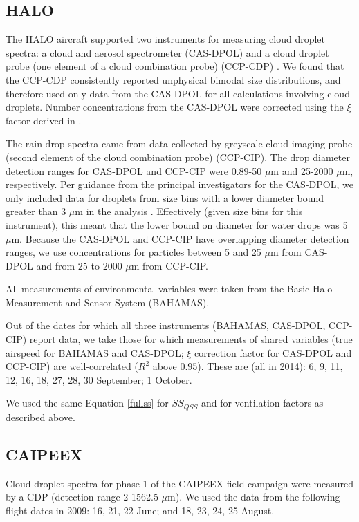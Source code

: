 \documentclass{article}
\begin{document}
\clearpage
\newpage

\subsection{HALO}

The HALO aircraft supported two instruments for measuring cloud droplet spectra: a cloud and aerosol spectrometer (CAS-DPOL) and a cloud droplet probe (one element of a cloud combination probe) (CCP-CDP) \cite{Braga2017}. We found that the CCP-CDP consistently reported unphysical bimodal size distributions, and therefore used only data from the CAS-DPOL for all calculations involving cloud droplets. Number concentrations from the CAS-DPOL were corrected using the $\xi$ factor derived in \cite{Weigel2016}.

The rain drop spectra came from data collected by greyscale cloud imaging probe (second element of the cloud combination probe) (CCP-CIP). The drop diameter detection ranges for CAS-DPOL and CCP-CIP were 0.89-50 $\mu$m and 25-2000 $\mu$m, respectively. Per guidance from the principal investigators for the CAS-DPOL, we only included data for droplets from size bins with a lower diameter bound greater than 3 $\mu$m in the analysis \cite{Jurkat2020}. Effectively (given size bins for this instrument), this meant that the lower bound on diameter for water drops was 5 $\mu$m. Because the CAS-DPOL and CCP-CIP have overlapping diameter detection ranges, we use concentrations for particles between 5 and 25 $\mu$m from CAS-DPOL and from 25 to 2000 $\mu$m from CCP-CIP. 

All measurements of environmental variables were taken from the Basic Halo Measurement and Sensor System (BAHAMAS).

Out of the dates for which all three instruments (BAHAMAS, CAS-DPOL, CCP-CIP) report data, we take those for which measurements of shared variables (true airspeed for BAHAMAS and CAS-DPOL; $\xi$ correction factor for CAS-DPOL and CCP-CIP) are well-correlated ($R^2$ above 0.95). These are (all in 2014): 6, 9, 11, 12, 16, 18, 27, 28, 30 September; 1 October.

We used the same Equation \ref{fullss} for $SS_{QSS}$ and for ventilation factors as described above.

\subsection{CAIPEEX}

Cloud droplet spectra for phase 1 of the CAIPEEX field campaign were measured by a CDP (detection range 2-1562.5 $\mu$m). We used the data from the following flight dates in 2009: 16, 21, 22 June; and 18, 23, 24, 25 August.
\end{document}
